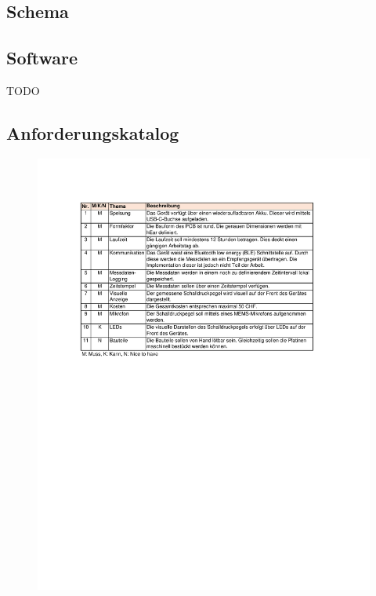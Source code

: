 \documentclass[12pt]{article}
\begin{document}
	\subsection{Schema}
	\begin{minipage}[b]{\textwidth}
		
	\end{minipage}
	
	\newpage
	\subsection{Software} \label{Anhang:Software}
	\color{red}TODO\color{black}
	\newpage
	\subsection{Anforderungskatalog}\label{Anhang:Anforderungskatalog}
	\begin{figure}[H]
		\centering
		\includegraphics[trim= 2.5cm 5cm 0cm 3.5cm, width=1.2\linewidth]{images/BAT_Anforderungskatalog}
	\end{figure}
	\newpage
\end{document}
